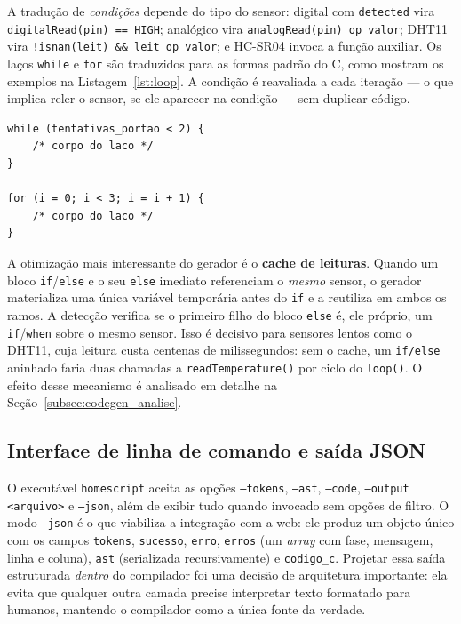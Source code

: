 \documentclass[conference]{IEEEtran}
\begin{document}
A tradução de \emph{condições} depende do tipo do sensor: digital com
\texttt{detected} vira \texttt{digitalRead(pin) == HIGH}; analógico vira
\texttt{analogRead(pin) op valor}; DHT11 vira
\texttt{!isnan(leit) \&\& leit op valor}; e HC-SR04 invoca a função
auxiliar. Os laços \texttt{while} e \texttt{for} são traduzidos para as formas
padrão do C, como mostram os exemplos na Listagem~\ref{lst:loop}. A condição
é reavaliada a cada iteração --- o que implica reler o sensor, se ele
aparecer na condição --- sem duplicar código.

\begin{lstlisting}[style=csmall,caption={Padrão de geração de laços.},label={lst:loop}]
while (tentativas_portao < 2) {
    /* corpo do laco */
}

for (i = 0; i < 3; i = i + 1) {
    /* corpo do laco */
}
\end{lstlisting}

A otimização mais interessante do gerador é o \textbf{cache de leituras}.
Quando um bloco \texttt{if}/\texttt{else} e o seu \texttt{else} imediato
referenciam o \emph{mesmo} sensor, o gerador materializa uma única variável
temporária antes do \texttt{if} e a reutiliza em ambos os ramos. A detecção
verifica se o primeiro filho do bloco \texttt{else} é, ele próprio, um
\texttt{if}/\texttt{when} sobre o mesmo sensor. Isso é decisivo para
sensores lentos como o DHT11, cuja leitura custa centenas de
milissegundos: sem o cache, um \texttt{if/else} aninhado faria duas
chamadas a \texttt{readTemperature()} por ciclo do \texttt{loop()}. O
efeito desse mecanismo é analisado em detalhe na
Seção~\ref{subsec:codegen_analise}.

\subsection{Interface de linha de comando e saída JSON}

O executável \texttt{homescript} aceita as opções \texttt{--tokens},
\texttt{--ast}, \texttt{--code}, \texttt{--output <arquivo>} e
\texttt{--json}, além de exibir tudo quando invocado sem opções de filtro.
O modo \texttt{--json} é o que viabiliza a integração com a web: ele produz
um objeto único com os campos \texttt{tokens}, \texttt{sucesso},
\texttt{erro}, \texttt{erros} (um \emph{array} com fase, mensagem, linha e
coluna), \texttt{ast} (serializada recursivamente) e \texttt{codigo\_c}.
Projetar essa saída estruturada \emph{dentro} do compilador foi uma decisão
de arquitetura importante: ela evita que qualquer outra camada precise
interpretar texto formatado para humanos, mantendo o compilador como a
única fonte da verdade.
\end{document}
